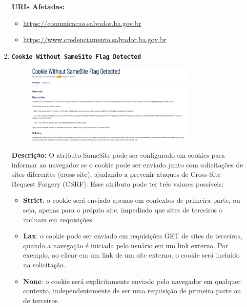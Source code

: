 \documentclass[a4paper,12pt]{article}
\begin{document}
\begin{enumerate}
\textbf{URIs Afetadas:}
\begin{itemize}
    \item \url{https://comunicacao.salvador.ba.gov.br}
    \item \url{https://www.credenciamento.salvador.ba.gov.br}
\end{itemize}

\item \textbf{\texttt{Cookie Without SameSite Flag Detected}}

                        \begin{figure}[h!]
                        \centering
                        \includegraphics[width=0.8\textwidth]{assets/images-was/Vulnerabilidades em Cookies e Segurança de Sessão/Cookie Without SameSite Flag Detected.png}
                        \end{figure}
                        \FloatBarrier
                        \textbf{Descrição:} O atributo SameSite pode ser configurado em cookies para informar ao navegador se o cookie pode ser enviado junto com solicitações de sites diferentes (cross-site), ajudando a prevenir ataques de Cross-Site Request Forgery (CSRF). Esse atributo pode ter três valores possíveis:

    \begin{itemize}
    \item \textbf{Strict}: o cookie será enviado apenas em contextos de primeira parte, ou seja, apenas para o próprio site, impedindo que sites de terceiros o incluam em requisições.
    \item \textbf{Lax}: o cookie pode ser enviado em requisições GET de sites de terceiros, quando a navegação é iniciada pelo usuário em um link externo. Por exemplo, ao clicar em um link de um site externo, o cookie será incluído na solicitação.
    \item \textbf{None}: o cookie será explicitamente enviado pelo navegador em qualquer contexto, independentemente de ser uma requisição de primeira parte ou de terceiros.
    \end{itemize}


\end{enumerate}
\end{document}
